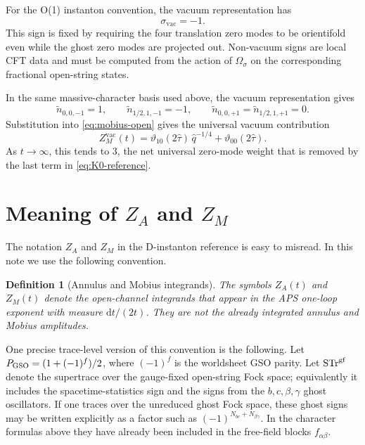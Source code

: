 \documentclass[11pt]{article}
\newcommand{\wt}{\widetilde}
\newcommand{\vac}{\mathrm{vac}}
\newcommand{\orient}{\Omega_\sigma}
\newcommand{\dd}{\mathrm{d}}
\newcommand{\vart}{\vartheta}
\newcommand{\hattau}{\widehat{\tau}}
\newcommand{\hatq}{\widehat{q}}
\newtheorem{definition}{Definition}
\begin{document}
For the O(1) instanton convention, the vacuum representation has
\begin{equation}
  \sigma_{\vac}=-1.
  \label{eq:sigma-vac}
\end{equation}
This sign is fixed by requiring the four translation zero modes to be orientifold even while
the ghost zero modes are projected out. Non-vacuum signs are local CFT data and must be
computed from the action of $\orient$ on the corresponding fractional open-string states.

In the same massive-character basis used above, the vacuum representation gives
\begin{equation}
  \wt n_{0,0,-1}=1,
  \qquad
  \wt n_{1/2,1,-1}=-1,
  \qquad
  \wt n_{0,0,+1}=\wt n_{1/2,1,+1}=0.
  \label{eq:mobius-vacuum-coefficients}
\end{equation}
Substitution into \eqref{eq:mobius-open} gives the universal vacuum contribution
\begin{equation}
  Z_M^{\vac}(t)
  =
  \vart_{10}(2\hattau)\,\hatq^{-1/4}
  +
  \vart_{00}(2\hattau).
  \label{eq:mobius-vacuum}
\end{equation}
As $t\to\infty$, this tends to $3$, the net universal zero-mode weight that is removed by the
last term in \eqref{eq:K0-reference}.

\section{Meaning of \texorpdfstring{$Z_A$}{ZA} and \texorpdfstring{$Z_M$}{ZM}}

The notation $Z_A$ and $Z_M$ in the D-instanton reference is easy to misread. In this note we
use the following convention.

\begin{definition}[Annulus and Mobius integrands]
The symbols $Z_A(t)$ and $Z_M(t)$ denote the open-channel integrands that appear in the
APS one-loop exponent with measure $\dd t/(2t)$. They are not the already
integrated annulus and Mobius amplitudes.
\end{definition}

One precise trace-level version of this convention is the following. Let
$P_{\rm GSO}=(1+(-1)^f)/2$, where $(-1)^f$ is the worldsheet GSO parity. Let
$\operatorname{STr}^{\rm gf}$ denote the supertrace over the gauge-fixed open-string Fock
space; equivalently it includes the spacetime-statistics sign and the signs from the
$b,c,\beta,\gamma$ ghost oscillators. If one traces over the unreduced ghost Fock space, these
ghost signs may be written explicitly as a factor such as
$(-1)^{N_{bc}+N_{\beta\gamma}}$. In the character formulas above they have already been
included in the free-field blocks $f_{\alpha\beta}$.
\end{document}
